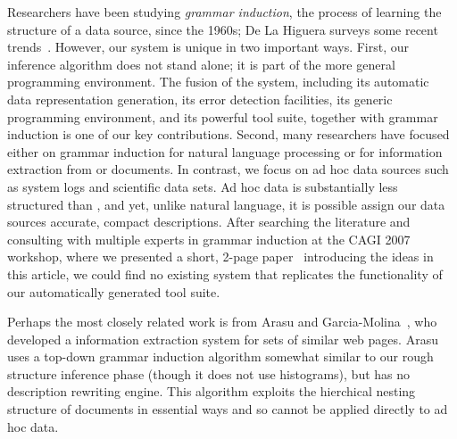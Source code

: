 Researchers have been studying {\em grammar induction}, the process of
learning the structure of a data source, since the 1960s; De La Higuera
surveys some recent trends~\cite{higuera01current}.  However,
our system is unique in two important ways.  First, our inference
algorithm does not stand alone; it is part of the more general \pads{}
programming environment.  The fusion of the
\pads{} system, including its automatic data representation generation,
its error detection facilities, its generic programming environment, 
and its powerful tool suite, together with grammar induction
is one of our key contributions.  Second, many researchers have
focused either on grammar induction for natural language processing or
for information extraction from \xml{} or \html{} documents.  In
contrast, we focus on ad hoc data sources such as system logs and
scientific data sets. Ad hoc data is substantially less
structured than \xml{}, and yet, unlike natural language, it is
possible assign our data sources accurate, compact descriptions.  After 
searching the literature and consulting
with multiple experts in grammar induction at the CAGI 2007 
workshop, where we presented a short, 2-page paper~\cite{burke+:cagi07} 
introducing the ideas in this article, we could find no existing 
system that replicates the functionality of our automatically 
generated tool suite.


Perhaps the most closely related work is from Arasu and 
Garcia-Molina~\cite{arasu+:sigmod03}, who developed a information
extraction system for sets of similar web pages.  
Arasu uses a top-down grammar induction
algorithm somewhat similar to our rough structure inference phase
(though it does not use histograms),
but has no description rewriting engine.  
This algorithm exploits the hierchical nesting
structure of \xml{} documents in essential ways
and so cannot be applied directly to ad hoc data.  

